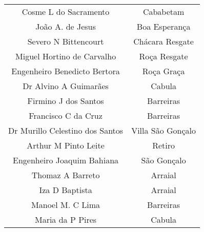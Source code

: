 \begin{tiny}
\begin{longtable}{c|c}
Cosme L do Sacramento & Cababetam \\
João A. de Jesus & Boa Esperança \\
Severo N Bittencourt & Chácara Resgate \\
Miguel Hortino de Carvalho & Roça Resgate \\
Engenheiro Benedicto Bertora & Roça Graça \\
Dr Alvino A Guimarães & Cabula \\
Firmino J dos Santos  & Barreiras \\
Francisco C da Cruz & Barreiras \\
Dr Murillo Celestino dos Santos & Villa São Gonçalo \\
Arthur M Pinto Leite  & Retiro \\
Engenheiro Joaquim Bahiana & São Gonçalo \\
Thomaz A Barreto & Arraial \\
Iza D Baptista & Arraial \\
Manoel M. C Lima & Barreiras \\
Maria da P Pires & Cabula \\
\hline
\end{longtable}
\end{tiny}